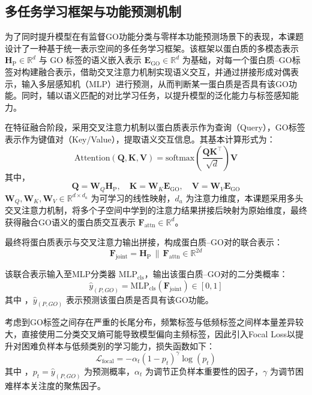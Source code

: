\subsection{多任务学习框架与功能预测机制}

为了同时提升模型在有监督GO功能分类与零样本功能预测场景下的表现，本课题设计了一种基于统一表示空间的多任务学习框架。该框架以蛋白质的多模态表示 $\mathbf{H}_{\text{P}} \in \mathbb{R}^d$ 与 GO 标签的语义嵌入表示 $\mathbf{E}_{\text{GO}} \in \mathbb{R}^d$ 为基础，对每一个蛋白质–GO标签对构建融合表示，借助交叉注意力机制实现语义交互，并通过拼接形成对偶表示，输入多层感知机（MLP）进行预测，从而判断某一蛋白质是否具有该GO功能。同时，辅以语义匹配的对比学习任务，以提升模型的泛化能力与标签感知能力。

在特征融合阶段，采用交叉注意力机制\cite{hou2019cross}以蛋白质表示作为查询（Query），GO标签表示作为键值对（Key/Value），提取语义交互信息。其基本计算形式为：
\begin{equation}
\text{Attention}(\mathbf{Q}, \mathbf{K}, \mathbf{V}) = \text{softmax}\left( \frac{\mathbf{Q} \mathbf{K}^\top}{\sqrt{d}} \right)\mathbf{V}
\end{equation}
其中，
\begin{equation}
\mathbf{Q} = \mathbf{W}_Q \mathbf{H}_{\text{P}}, \quad \mathbf{K} = \mathbf{W}_K \mathbf{E}_{\text{GO}}, \quad \mathbf{V} = \mathbf{W}_V \mathbf{E}_{\text{GO}}
\end{equation}
$\mathbf{W}_Q, \mathbf{W}_K, \mathbf{W}_V \in \mathbb{R}^{d \times d_a}$ 为可学习的线性映射，$d_a$ 为注意力维度，本课题采用多头交叉注意力机制，将多个子空间中学到的注意力结果拼接后映射为原始维度，最终获得融合GO语义的蛋白质交互表示 $\mathbf{F}_{\text{attn}} \in \mathbb{R}^d$。

最终将蛋白质表示与交叉注意力输出拼接，构成蛋白质–GO对的联合表示：
\begin{equation}
\mathbf{F}_{\text{joint}} = \mathbf{H}_{\text{P}} \, \| \, \mathbf{F}_{\text{attn}} \in \mathbb{R}^{2d}
\end{equation}

该联合表示输入至MLP分类器 $\text{MLP}_{\text{cls}}$，输出该蛋白质–GO对的二分类概率：
\begin{equation}
\hat{y}_{(P, GO)} = \text{MLP}_{\text{cls}}(\mathbf{F}_{\text{joint}}) \in [0, 1]
\end{equation}
其中 ，$\hat{y}_{(P, GO)}$ 表示预测该蛋白质是否具有该GO功能。

考虑到GO标签之间存在严重的长尾分布，频繁标签与低频标签之间样本量差异较大，直接使用二分类交叉熵可能导致模型偏向主频标签，因此引入Focal Loss以提升对困难负样本与低频类别的学习能力，损失函数如下：
\begin{equation}
\mathcal{L}_{\text{focal}} = -\alpha_t (1 - p_t)^\gamma \log(p_t)
\end{equation}
其中 ，$p_t = \hat{y}_{(P, GO)}$ 为预测概率，$\alpha_t$ 为调节正负样本重要性的因子，$\gamma$ 为调节困难样本关注度的聚焦因子。

